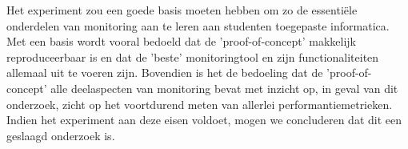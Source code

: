 Het experiment zou een goede basis moeten hebben om zo de essentiële onderdelen van monitoring aan te leren aan studenten toegepaste informatica. Met een basis wordt vooral bedoeld dat de 'proof-of-concept' makkelijk reproduceerbaar is en dat de 'beste' monitoringtool en zijn functionaliteiten allemaal uit te voeren zijn. Bovendien is het de bedoeling dat de 'proof-of-concept' alle deelaspecten van monitoring bevat met inzicht op, in geval van dit onderzoek, zicht op het voortdurend meten van allerlei performantiemetrieken. Indien het experiment aan deze eisen voldoet, mogen we concluderen dat dit een geslaagd onderzoek is.

